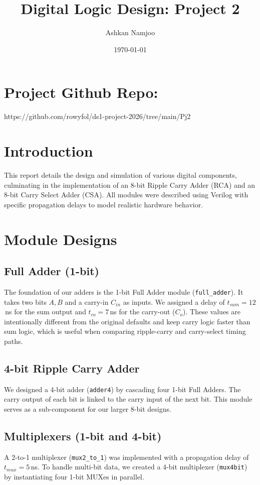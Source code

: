 \documentclass[a4paper,12pt]{article}
\title{Digital Logic Design: Project 2}
\author{Ashkan Namjoo}
\date{\today}
\begin{document}
\maketitle

\section{Project Github Repo:}
https://github.com/rowyfol/ds1-project-2026/tree/main/Pj2
\section{Introduction}
This report details the design and simulation of various digital components, culminating in the implementation of an 8-bit Ripple Carry Adder (RCA) and an 8-bit Carry Select Adder (CSA). All modules were described using Verilog with specific propagation delays to model realistic hardware behavior.

\section{Module Designs}

\subsection{Full Adder (1-bit)}
The foundation of our adders is the 1-bit Full Adder module (\texttt{full\_adder}). It takes two bits $A, B$ and a carry-in $C_{in}$ as inputs. We assigned a delay of $t_{sum} = 12$\,ns for the sum output and $t_{co} = 7$\,ns for the carry-out ($C_o$). These values are intentionally different from the original defaults and keep carry logic faster than sum logic, which is useful when comparing ripple-carry and carry-select timing paths.

\subsection{4-bit Ripple Carry Adder}
We designed a 4-bit adder (\texttt{adder4}) by cascading four 1-bit Full Adders. The carry output of each bit is linked to the carry input of the next bit. This module serves as a sub-component for our larger 8-bit designs.

\subsection{Multiplexers (1-bit and 4-bit)}
A 2-to-1 multiplexer (\texttt{mux2\_to\_1}) was implemented with a propagation delay of $t_{mux} = 5$\,ns. To handle multi-bit data, we created a 4-bit multiplexer (\texttt{mux4bit}) by instantiating four 1-bit MUXes in parallel.
\end{document}
